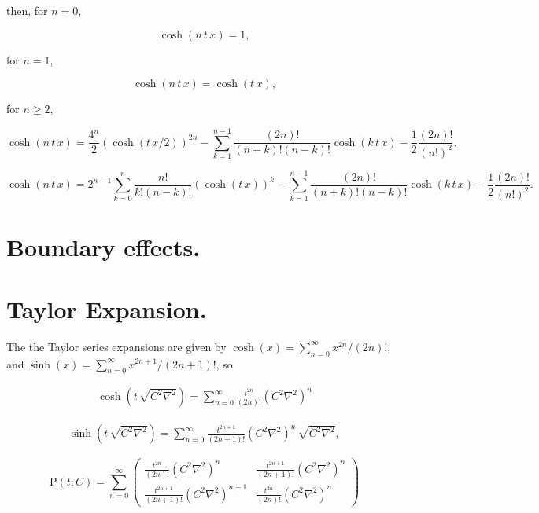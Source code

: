 \documentclass[amsmath,amssymb,floatfix]{revtex4}
\numberwithin{equation}{section}
\newcommand{\twomat}[4]{ \left( \begin{array}{cc} #1 & #2 \\ #3 & #4  \end{array} \right) }
\begin{document}
\noindent
then, for $n = 0$,

\begin{equation}
\cosh{(n \, t \, x)} = 1,
\end{equation}

\noindent
for $n = 1$,

\begin{equation}
\cosh{(n \, t \, x)} = \cosh{( t \, x)},
\end{equation}

\noindent
for $n \ge 2$,

\begin{equation}
\cosh{(n \, t \, x)} = \frac{4^n}{2} (\cosh{(t \, x/2)})^{2n} - \sum_{k=1}^{n-1} \frac{(2n)!}{(n+k)!(n-k)!} \cosh{(k \, t \, x)} - \frac{1}{2} \frac{(2n)!}{(n!)^2}.
\end{equation}


\begin{equation}
\cosh{(n \, t \, x)} = 2^{n-1}  \sum_{k=0}^{n} \frac{n!}{k!(n-k)!} (\cosh{(t \, x)})^{k} - \sum_{k=1}^{n-1} \frac{(2n)!}{(n+k)!(n-k)!} \cosh{(k \, t \, x)} - \frac{1}{2} \frac{(2n)!}{(n!)^2}.
\end{equation}


\section{\label{sec:level3}Boundary effects.\protect}





\section{\label{sec:level3}Taylor Expansion.\protect}


The the Taylor series expansions are given by $\cosh{(x)} = \sum_{n=0}^\infty x^{2n}/(2 n)!$, and $\sinh{(x)} = \sum_{n=0}^\infty x^{2n+1}/(2 n+1)!$, so


\begin{eqnarray}
\cosh{( t \, \sqrt{C^2\nabla^2} )} =  \sum_{n=0}^\infty \frac{t^{2n}}{(2n)!} (C^2\nabla^2)^n
\end{eqnarray}

\begin{eqnarray}
\sinh{( t \, \sqrt{C^2\nabla^2} )} =  \sum_{n=0}^\infty \frac{t^{2n+1}}{(2n+1)!} (C^2\nabla^2)^n \, \sqrt{C^2\nabla^2},
\end{eqnarray}


\begin{equation}
	 \textrm{P}(t; C) = \sum_{n=0}^\infty \twomat{\frac{t^{2n}}{(2n)!}(C^2\nabla^2)^n}{\frac{t^{2n+1}}{(2n+1)!}(C^2\nabla^2)^n}{\frac{t^{2n+1}}{(2n+1)!}(C^2\nabla^2)^{n+1}}{\frac{t^{2n}}{(2n)!}(C^2\nabla^2)^n}
\end{equation}
	 
\end{document}
